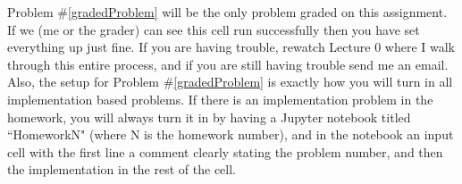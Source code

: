 \documentclass[11pt]{article}
\begin{document}
Problem \#\ref{gradedProblem} will be the only problem graded on this assignment.  If we (me or the grader) can see this cell run successfully then you have set everything up just fine.  If you are having trouble, rewatch Lecture 0 where I walk through this entire process, and if you are still having trouble send me an email.  Also, the setup for Problem \#\ref{gradedProblem} is exactly how you will turn in all implementation based problems.  If there is an implementation problem in the homework, you will always turn it in by having a Jupyter notebook titled ``HomeworkN" (where N is the homework number), and in the notebook an input cell with the first line a comment clearly stating the problem number, and then the implementation in the rest of the cell.
\end{document}
